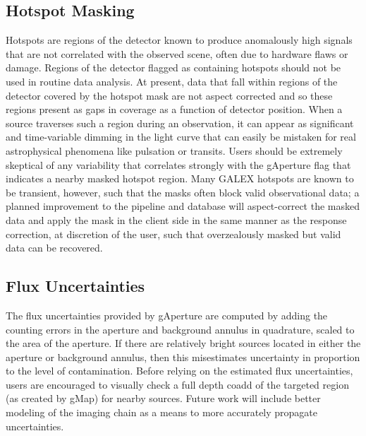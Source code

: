 \documentclass[preprint]{aastex}
\begin{document}
\subsection{Hotspot Masking}
\label{hotspot}
Hotspots are regions of the detector known to produce anomalously high signals that are not correlated with the observed scene, often due to hardware flaws or damage. Regions of the detector flagged as containing hotspots should not be used in routine data analysis. At present, data that fall within regions of the detector covered by the hotspot mask are not aspect corrected and so these regions present as gaps in coverage as a function of detector position. When a source traverses such a region during an observation, it can appear as significant and time-variable dimming in the light curve that can easily be mistaken for real astrophysical phenomena like pulsation or transits. Users should be extremely skeptical of any variability that correlates strongly with the gAperture flag that indicates a nearby masked hotspot region. Many GALEX hotspots are known to be transient, however, such that the masks often block valid observational data; a planned improvement to the pipeline and database will aspect-correct the masked data and apply the mask in the client side in the same manner as the response correction, at discretion of the user, such that overzealously masked but valid data can be recovered.

\subsection{Flux Uncertainties}
\label{fluxuncert}
The flux uncertainties provided by gAperture are computed by adding the counting errors in the aperture and background annulus in quadrature, scaled to the area of the aperture. If there are relatively bright sources located in either the aperture or background annulus, then this misestimates uncertainty in proportion to the level of contamination. Before relying on the estimated flux uncertainties, users are encouraged to visually check a full depth coadd of the targeted region (as created by gMap) for nearby sources. Future work will include better modeling of the imaging chain as a means to more accurately propagate uncertainties.
\end{document}
